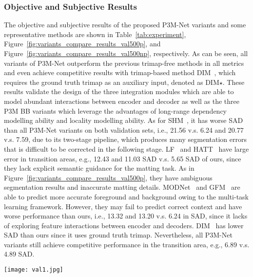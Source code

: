 \documentclass[twocolumn]{svjour3}
\begin{document}
\subsubsection{Objective and Subjective Results}
\label{sec:exp}

The objective and subjective results of the proposed P3M-Net variants and some representative methods are shown in Table~\ref{tab:experiment}, Figure~\ref{fig:variants_compare_results_val500p}, and Figure~\ref{fig:variants_compare_results_val500np}, respectively. As can be seen, all variants of P3M-Net outperform the previous trimap-free methods in all metrics and even achieve competitive results with trimap-based method DIM~\citep{dim}, which requires the ground truth trimap as an auxiliary input, denoted as DIM$\star$. These results validate the design of the three integration modules which are able to model abundant interactions between encoder and decoder as well as the three P3M BB variants which leverage the advantages of long-range dependency modelling ability and locality modelling ability. As for SHM~\citep{shm}, it has worse SAD than all P3M-Net variants on both validation sets, i.e., 21.56 v.s. 6.24 and 20.77 v.s. 7.59, due to its two-stage pipeline, which produces many segmentation errors that is difficult to be corrected in the following stage. LF~\citep{lf} and HATT~\citep{hatt} have large error in transition areas, e.g., 12.43 and 11.03 SAD v.s. 5.65 SAD of ours, since they lack explicit semantic guidance for the matting task. As in Figure~\ref{fig:variants_compare_results_val500p}, they have ambiguous segmentation results and inaccurate matting details. MODNet~\citep{modnet} and GFM~\citep{gfm} are able to predict more accurate foreground and background owing to the multi-task learning framework. However, they may fail to predict correct context and have worse performance than ours, i.e., 13.32 and 13.20 v.s. 6.24 in SAD, since it lacks of exploring feature interactions between encoder and decoders. DIM~\citep{dim} has lower SAD than ours since it uses ground truth trimap. Nevertheless, all P3M-Net variants still achieve competitive performance in the transition area, e.g., 6.89 v.s. 4.89 SAD. 


\begin{figure*}[hbtp]
    \centering
    \texttt{[image: val1.jpg]}
    \caption{Visual results of SOTA methods and the proposed P3M-Net variants on P3M-500-P. Among all the methods, only DIM~\citep{dim} requires an extra trimap as input while the others are automatic methods.}
    \label{fig:variants_compare_results_val500p}
\end{figure*}
\end{document}
